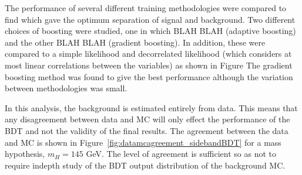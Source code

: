 The performance of several different training methodologies were compared to find which gave the optimum separation of signal and background.
Two different choices of boosting were studied, one in which BLAH BLAH (adaptive boosting) and the other BLAH BLAH (gradient boosting).
In addition, these were compared to a simple likelihood and decorrelated likelihood (which considers at most linear correlations between the variables)
as shown in Figure
The gradient boosting method was found to give the best performance although the variation between methodologies was small.
 



In this analysis, the background is estimated entirely from data. This means that any disagreement between
data and MC will only effect the performance of the BDT and not the validity of the final results. 
The agreement between the data and MC is shown in Figure~\ref{fig:datamcagreement_sidebandBDT} for a mass 
hypothesis, $m_{H}=145$ GeV. The level of agreement is sufficient so as not to require indepth study of the
BDT output distribution of the background MC.

